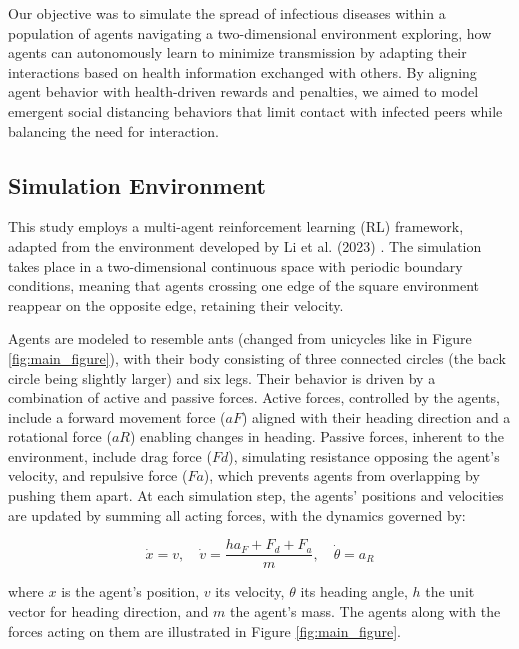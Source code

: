 \documentclass[9pt]{IEEEtran}
\begin{document}
Our objective was to simulate the spread of infectious diseases within a population of agents navigating a two-dimensional environment exploring, how agents can autonomously learn to minimize transmission by adapting their interactions based on health information exchanged with others. By aligning agent behavior with health-driven rewards and penalties, we aimed to model emergent social distancing behaviors that limit contact with infected peers while balancing the need for interaction.

\subsection{Simulation Environment}

This study employs a multi-agent reinforcement learning (RL) framework, adapted from the environment developed by Li et al. (2023) \cite{li2023predator}. The simulation takes place in a two-dimensional continuous space with periodic boundary conditions, meaning that agents crossing one edge of the square environment reappear on the opposite edge, retaining their velocity.

Agents are modeled to resemble ants (changed from unicycles like in Figure \ref{fig:main_figure}), with their body consisting of three connected circles (the back circle being slightly larger) and six legs. Their behavior is driven by a combination of active and passive forces. Active forces, controlled by the agents, include a forward movement force ($aF$) aligned with their heading direction and a rotational force ($aR$) enabling changes in heading. Passive forces, inherent to the environment, include drag force ($Fd$), simulating resistance opposing the agent's velocity, and repulsive force ($Fa$), which prevents agents from overlapping by pushing them apart. At each simulation step, the agents' positions and velocities are updated by summing all acting forces, with the dynamics governed by:

$$ \dot{x} = v, \quad \dot{v} = \frac{ha_F + F_d + F_a}{m}, \quad \dot{\theta} = a_R $$  

where $x$ is the agent's position, $v$ its velocity, $\theta$ its heading angle, $h$ the unit vector for heading direction, and $m$ the agent's mass. The agents along with the forces acting on them are illustrated in Figure \ref{fig:main_figure}.
\end{document}
